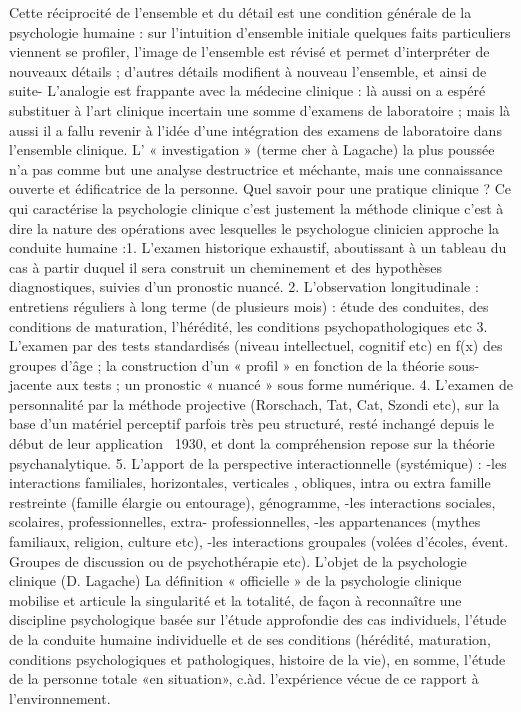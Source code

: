 Cette réciprocité de l’ensemble et du détail est une condition générale de la psychologie humaine : sur l’intuition d’ensemble initiale quelques faits particuliers viennent se profiler, l’image de l’ensemble est révisé et permet d’interpréter de nouveaux détails ; d’autres détails modifient à nouveau l’ensemble, et ainsi de suite-
L’analogie est frappante avec la médecine clinique : là aussi on a espéré substituer à l’art clinique incertain une somme d’examens de laboratoire ; mais là aussi il a fallu revenir à l’idée d’une intégration des examens de laboratoire dans l’ensemble clinique.
L’ « investigation » (terme cher à Lagache) la plus poussée n’a pas comme but une analyse destructrice et méchante, mais une connaissance ouverte et édificatrice de la personne. Quel savoir pour une pratique clinique ? Ce qui caractérise la psychologie clinique c’est justement la méthode clinique c’est à dire la nature des opérations avec lesquelles le psychologue clinicien approche la conduite humaine :1. L’examen historique exhaustif, aboutissant à un tableau du cas à partir duquel il sera construit un cheminement et des hypothèses diagnostiques, suivies d’un pronostic nuancé.
2. L’observation longitudinale : entretiens réguliers à long terme (de plusieurs mois) : étude des conduites, des conditions de maturation, l’hérédité, les conditions psychopathologiques etc
3. L’examen par des tests standardisés (niveau intellectuel, cognitif etc) en f(x) des groupes d’âge ; la construction d’un « profil » en fonction de la théorie sous-jacente aux tests ; un pronostic « nuancé » sous forme numérique.
4. L’examen de personnalité par la méthode projective (Rorschach, Tat, Cat, Szondi etc), sur la base d’un matériel perceptif parfois très peu structuré, resté inchangé depuis le début de leur application ~1930, et dont la compréhension repose sur la théorie psychanalytique.
5. L’apport de la perspective interactionnelle (systémique) :
-les interactions familiales, horizontales, verticales , obliques, intra ou extra famille restreinte (famille élargie ou entourage), génogramme,
-les interactions sociales, scolaires, professionnelles, extra- professionnelles, -les appartenances (mythes familiaux, religion, culture etc),
-les interactions groupales (volées d’écoles, évent. Groupes de discussion ou
de psychothérapie etc).
L’objet de la psychologie clinique (D. Lagache)
La définition « officielle » de la psychologie clinique mobilise et articule la singularité et
la totalité, de façon à reconnaître une discipline psychologique basée sur l’étude approfondie des cas individuels, l’étude de la conduite humaine individuelle et de ses conditions (hérédité, maturation, conditions psychologiques et pathologiques, histoire de la vie), en somme, l’étude de la personne totale «en situation», c.àd. l’expérience vécue de ce rapport à l’environnement.
